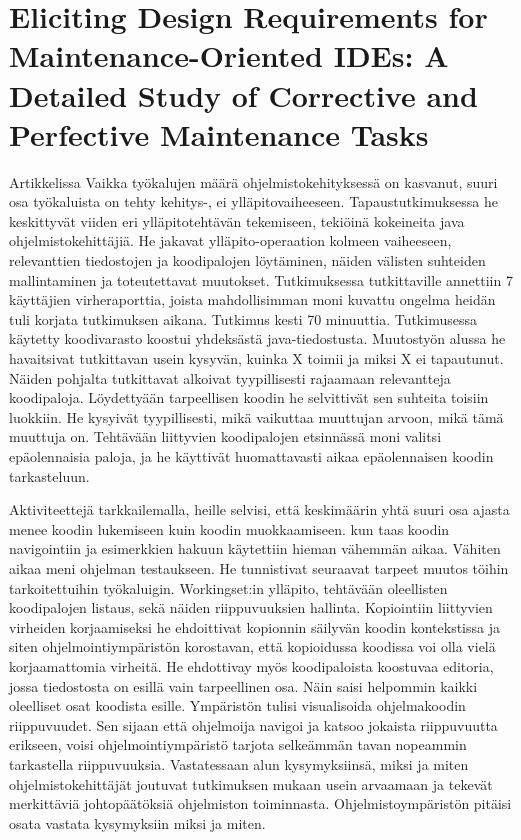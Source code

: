 \documentclass[finnish]{../tktltiki2}
\theoremstyle{definition}
\theoremstyle{remark}
\begin{document}
\section{Eliciting Design Requirements for Maintenance-Oriented IDEs: A Detailed Study of Corrective and Perfective Maintenance Tasks}
Artikkelissa \cite{eliciting-design-requirements-for-maintenance-oriented-ides}
Vaikka työkalujen määrä ohjelmistokehityksessä on kasvanut, suuri osa työkaluista on tehty kehitys-, ei ylläpitovaiheeseen. Tapaustutkimuksessa he keskittyvät viiden eri ylläpitotehtävän tekemiseen, tekiöinä kokeineita java ohjelmistokehittäjiä.
He jakavat ylläpito-operaation kolmeen vaiheeseen, relevanttien tiedostojen ja koodipalojen löytäminen, näiden välisten suhteiden mallintaminen ja toteutettavat muutokset.
Tutkimuksessa tutkittaville annettiin 7 käyttäjien virheraporttia, joista mahdollisimman moni kuvattu ongelma heidän tuli korjata tutkimuksen aikana. Tutkimus kesti 70 minuuttia.
Tutkimusessa käytetty koodivarasto koostui yhdeksästä java-tiedostusta.
Muutostyön alussa he havaitsivat tutkittavan usein kysyvän, kuinka X toimii ja miksi X ei tapautunut. Näiden pohjalta tutkittavat alkoivat tyypillisesti rajaamaan relevantteja koodipaloja.
Löydettyään tarpeellisen koodin he selvittivät sen suhteita toisiin luokkiin. He kysyivät tyypillisesti, mikä vaikuttaa muuttujan arvoon, mikä tämä muuttuja on.
Tehtävään liittyvien koodipalojen etsinnässä moni valitsi epäolennaisia paloja, ja he käyttivät huomattavasti aikaa epäolennaisen koodin tarkasteluun.

Aktiviteettejä tarkkailemalla, heille selvisi, että keskimäärin yhtä suuri osa ajasta menee koodin lukemiseen kuin koodin muokkaamiseen. kun taas koodin navigointiin ja esimerkkien hakuun käytettiin hieman vähemmän aikaa. Vähiten aikaa meni ohjelman testaukseen.
He tunnistivat seuraavat tarpeet muutos töihin tarkoitettuihin työkaluigin.
Workingset:in ylläpito, tehtävään oleellisten koodipalojen listaus, sekä näiden riippuvuuksien hallinta. Kopiointiin liittyvien virheiden korjaamiseksi he ehdoittivat kopionnin säilyvän koodin kontekstissa ja siten ohjelmointiympäristön korostavan, että kopioidussa koodissa voi olla vielä korjaamattomia virheitä.
He ehdottivay myös koodipaloista koostuvaa editoria, jossa tiedostosta on esillä vain tarpeellinen osa. Näin saisi helpommin kaikki oleelliset osat koodista esille.
Ympäristön tulisi visualisoida ohjelmakoodin riippuvuudet. Sen sijaan että ohjelmoija navigoi ja katsoo jokaista riippuvuutta erikseen, voisi ohjelmointiympäristö tarjota selkeämmän tavan nopeammin tarkastella riippuvuuksia.
Vastatessaan alun kysymyksiinsä, miksi ja miten ohjelmistokehittäjät joutuvat tutkimuksen mukaan usein arvaamaan ja tekevät merkittäviä johtopäätöksiä ohjelmiston toiminnasta. Ohjelmistoympäristön pitäisi osata vastata kysymyksiin miksi ja miten. %
\end{document}
